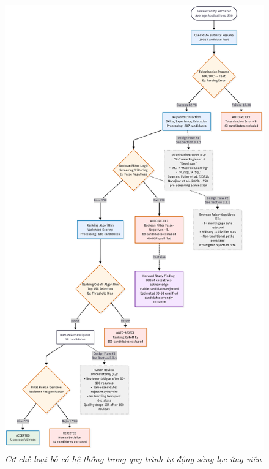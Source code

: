 \documentclass{article}
\begin{document}
\begin{figure}[H]
    \centering
    \includegraphics[width=0.8\linewidth]{img/ats-diagram.png}
    \caption{\textit{Cơ chế loại bỏ có hệ thống trong quy trình tự động sàng lọc ứng viên}}
    \label{fig:ats-diagram}
\end{figure}
\end{document}

